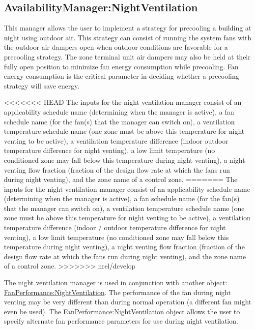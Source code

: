 \subsection{AvailabilityManager:NightVentilation}\label{availabilitymanagernightventilation}

This manager allows the user to implement a strategy for precooling a building at night using outdoor air. This strategy can consist of running the system fans with the outdoor air dampers open when outdoor conditions are favorable for a precooling strategy. The zone terminal unit air dampers may also be held at their fully open position to minimize fan energy consumption while precooling. Fan energy consumption is the critical parameter in deciding whether a precooling strategy will save energy.

<<<<<<< HEAD
The inputs for the night ventilation manager consist of an applicability schedule name (determining when the manager is active), a fan schedule name (for the fan(s) that the manager can switch on), a ventilation temperature schedule name (one zone must be above this temperature for night venting to be active), a ventilation temperature difference (indoor outdoor temperature difference for night venting), a low limit temperature (no conditioned zone may fall below this temperature during night venting), a night venting flow fraction (fraction of the design flow rate at which the fans run during night venting), and the zone name of a control zone.
=======
The inputs for the night ventilation manager consist of an applicability schedule name (determining when the manager is active), a fan schedule name (for the fan(s) that the manager can switch on), a ventilation temperature schedule name (one zone must be above this temperature for night venting to be active), a ventilation temperature difference (indoor / outdoor temperature difference for night venting), a low limit temperature (no conditioned zone may fall below this temperature during night venting), a night venting flow fraction (fraction of the design flow rate at which the fans run during night venting), and the zone name of a control zone.
>>>>>>> nrel/develop

The night ventilation manager is used in conjunction with another object: \hyperref[fanperformancenightventilation]{FanPerformance:NightVentilation}. The performance of the fan during night venting may be very different than during normal operation (a different fan might even be used). The \hyperref[fanperformancenightventilation]{FanPerformance:NightVentilation} object allows the user to specify alternate fan performance parameters for use during night ventilation.

